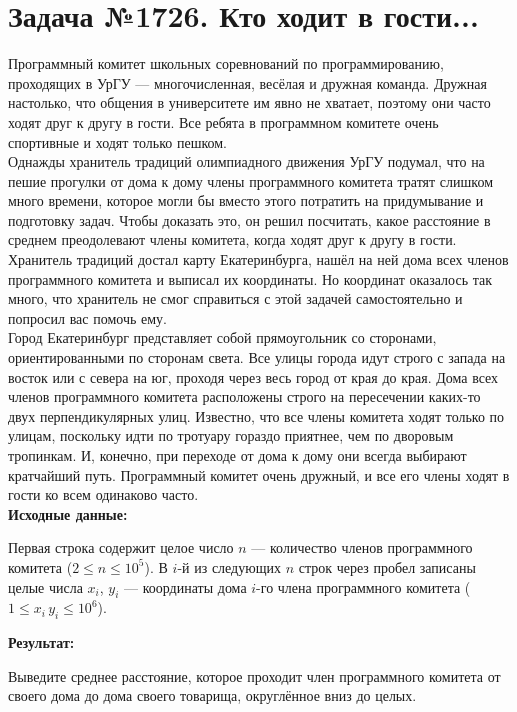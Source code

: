 \documentclass[a4paper,12pt]{article}
\begin{document}
\section*{Задача №1726. Кто ходит в гости...}
Программный комитет школьных соревнований по программированию, проходящих в УрГУ — многочисленная, весёлая и дружная команда. Дружная настолько, что общения в университете им явно не хватает, поэтому они часто ходят друг к другу в гости. Все ребята в программном комитете очень спортивные и ходят только пешком. \\[0.5em]
Однажды хранитель традиций олимпиадного движения УрГУ подумал, что на пешие прогулки от дома к дому члены программного комитета тратят слишком много времени, которое могли бы вместо этого потратить на придумывание и подготовку задач. Чтобы доказать это, он решил посчитать, какое расстояние в среднем преодолевают члены комитета, когда ходят друг к другу в гости. Хранитель традиций достал карту Екатеринбурга, нашёл на ней дома всех членов программного комитета и выписал их координаты. Но координат оказалось так много, что хранитель не смог справиться с этой задачей самостоятельно и попросил вас помочь ему.\\[0.5em]
Город Екатеринбург представляет собой прямоугольник со сторонами, ориентированными по сторонам света. Все улицы города идут строго с запада на восток или с севера на юг, проходя через весь город от края до края. Дома всех членов программного комитета расположены строго на пересечении каких-то двух перпендикулярных улиц. Известно, что все члены комитета ходят только по улицам, поскольку идти по тротуару гораздо приятнее, чем по дворовым тропинкам. И, конечно, при переходе от дома к дому они всегда выбирают кратчайший путь. Программный комитет очень дружный, и все его члены ходят в гости ко всем одинаково часто.\\[1em]
\textbf{Исходные данные:}
\begin{quotebox}
    Первая строка содержит целое число $n$ — количество членов программного комитета ($2 \leq n \leq 10^5$). В $i$-й из следующих $n$ строк через пробел записаны целые числа $x_i$, $y_i$ --- координаты дома $i$-го члена программного комитета ($1 \leq x_i\, y_i \leq 10^6$).
\end{quotebox}
\textbf{Результат:}
\begin{quotebox}
    Выведите среднее расстояние, которое проходит член программного комитета от своего дома до дома своего товарища, округлённое вниз до целых.
\end{quotebox}
\end{document}
